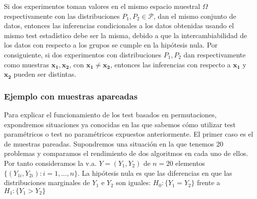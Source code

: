 \begin{definicion}
	Si dos experimentos toman valores en el mismo espacio
muestral $\Omega$ respectivamente con las distribuciones 
$P_1, P_2 \in \mathcal{P}$, dan el mismo conjunto de datos, 
entonces las inferencias condicionales a los datos obtenidas 
usando el mismo test estadístico debe 
ser la misma, debido a que la intercambiabilidad de los datos con 
respecto a los grupos se cumple en la hipótesis nula. Por 
consiguiente, si dos experimentos con distribuciones 
$P_1, P_2$ dan respectivamente como muestras $\mathbf{x_1}, 
\mathbf{x_2}$, con $\mathbf{x_1} \neq \mathbf{x_2}$, entonces 
las inferencias con respecto a $\mathbf{x_1}$ y 
$\mathbf{x_2}$ pueden ser distintas.
\end{definicion}


\subsubsection{Ejemplo con muestras apareadas}

	Para explicar el funcionamiento de los test basados en 
permutaciones, expondremos situaciones ya conocidas en las 
que sabemos cómo utilizar test paramétricos o test no 
paramétricos expuestos anteriormente. El primer caso es el de 
muestras pareadas. Supondremos una situación en la que 
tenemos 20 problemas y comparamos el rendimiento de dos
algoritmos en cada uno de ellos.
Por tanto consideramos la v.a. $Y = (Y_1, Y_2)$ de $n=20$ 
elementos $\{(Y_{1i},Y_{2i}): i = 1, \dots, n\}$. La 
hipótesis nula es que las diferencias en que las 
distribuciones marginales de $Y_1$ e $Y_2$ son iguales:
$H_0 : \{ Y_1 = Y_2 \}$ frente a $H_1: \{ Y_1 > Y_2 \}$\\
	
